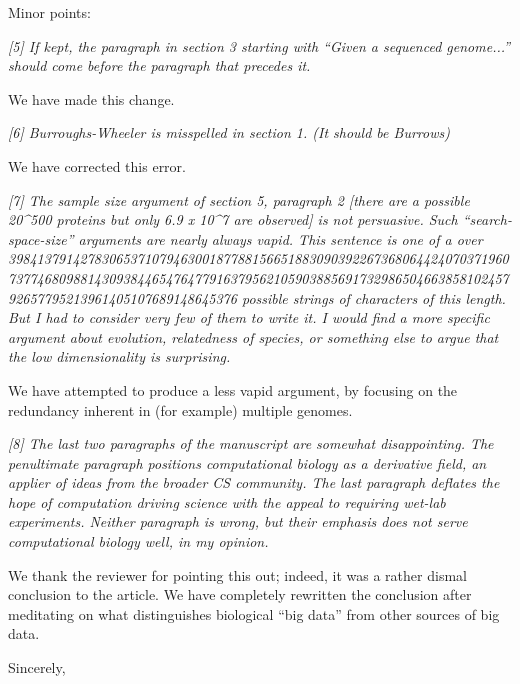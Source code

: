 \documentclass[12pt]{letter}
\begin{document}
\begin{letter}{}
Minor points:

\emph{[5] If kept, the paragraph in section 3 starting with ``Given a sequenced
genome...'' should come before the paragraph that precedes it.}

We have made this change.

\emph{[6] Burroughs-Wheeler is misspelled in section 1. (It should be Burrows)}

We have corrected this error.

\emph{[7] The sample size argument of section 5, paragraph 2 [there are a possible
20^500 proteins but only 6.9 x 10^7 are observed] is not persuasive. Such
``search-space-size'' arguments are nearly always vapid.  This sentence is one of
a over
3984137914278306537107946300187788156651883090392267368064424070371960737746809881430938446547647791637956210590388569173298650466385810245792657795213961405107689148645376
possible strings of characters of this length. But I had to consider very few
of them to write it. I would find a more specific argument about evolution,
relatedness of species, or something else to argue that the low dimensionality
is surprising.}

We have attempted to produce a less vapid argument, by focusing on the redundancy inherent in (for example) multiple genomes.

\emph{[8] The last two paragraphs of the manuscript are somewhat disappointing. The
penultimate paragraph positions computational biology as a derivative field, an
applier of ideas from the broader CS community. The last paragraph deflates the
hope of computation driving science with the appeal to requiring wet-lab
experiments.  Neither paragraph is wrong, but their emphasis does not serve
computational biology well, in my opinion. }

We thank the reviewer for pointing this out; indeed, it was a rather dismal conclusion to the article. We have completely rewritten the conclusion after meditating on what distinguishes biological ``big data'' from other sources of big data.

\closing{\hspace*{.5in}Sincerely,}
\end{letter} 
\end{document}
